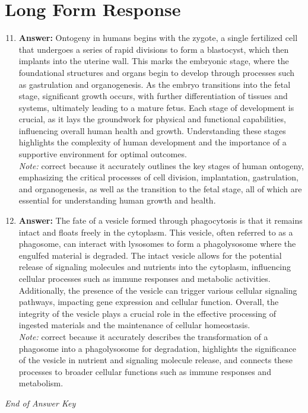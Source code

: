 \documentclass[12pt]{article}
\begin{document}
\section*{Long Form Response}
\begin{enumerate}[label=\arabic*.]
\setcounter{enumi}{10}
\item \textbf{Answer:} Ontogeny in humans begins with the zygote, a single fertilized cell that undergoes a series of rapid divisions to form a blastocyst, which then implants into the uterine wall. This marks the embryonic stage, where the foundational structures and organs begin to develop through processes such as gastrulation and organogenesis. As the embryo transitions into the fetal stage, significant growth occurs, with further differentiation of tissues and systems, ultimately leading to a mature fetus. Each stage of development is crucial, as it lays the groundwork for physical and functional capabilities, influencing overall human health and growth. Understanding these stages highlights the complexity of human development and the importance of a supportive environment for optimal outcomes.
\\ \textit{Note:} correct because it accurately outlines the key stages of human ontogeny, emphasizing the critical processes of cell division, implantation, gastrulation, and organogenesis, as well as the transition to the fetal stage, all of which are essential for understanding human growth and health.
\item \textbf{Answer:} The fate of a vesicle formed through phagocytosis is that it remains intact and floats freely in the cytoplasm. This vesicle, often referred to as a phagosome, can interact with lysosomes to form a phagolysosome where the engulfed material is degraded. The intact vesicle allows for the potential release of signaling molecules and nutrients into the cytoplasm, influencing cellular processes such as immune responses and metabolic activities. Additionally, the presence of the vesicle can trigger various cellular signaling pathways, impacting gene expression and cellular function. Overall, the integrity of the vesicle plays a crucial role in the effective processing of ingested materials and the maintenance of cellular homeostasis.
\\ \textit{Note:} correct because it accurately describes the transformation of a phagosome into a phagolysosome for degradation, highlights the significance of the vesicle in nutrient and signaling molecule release, and connects these processes to broader cellular functions such as immune responses and metabolism.
\end{enumerate}

\vfill
\noindent\textit{End of Answer Key}
\end{document}
